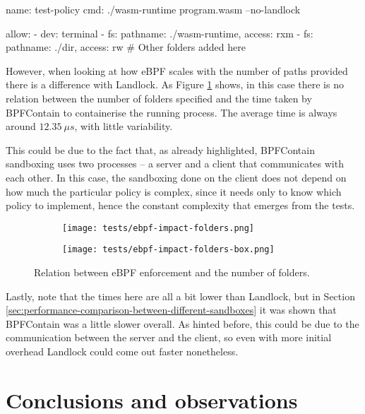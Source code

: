 \vspace*{0.5cm}
\begin{code}[language=yaml, caption=The outline of the policy used for eBPF tests., label=lst:ebpf-impact-policy-outline]
name: test-policy
cmd: ./wasm-runtime program.wasm --no-landlock

allow:
  - dev: terminal
  - fs: {pathname: ./wasm-runtime, access: rxm}
  - fs: {pathname: ./dir, access: rw}
  # Other folders added here
\end{code}

However, when looking at how eBPF scales with the number of paths provided there is a difference
with Landlock. As Figure \ref{fig:perf-test-ebpf-impact-folders} shows, in this case there is no relation between the number
of folders specified and the time taken by BPFContain to containerise the running process.
The average time is always around $12.35\ \mu s$, with little variability.

This could be due to the fact that, as already highlighted, BPFContain sandboxing uses two
processes -- a server and a client that communicates with each other.
In this case, the sandboxing done on the client does not depend on how much
the particular policy is complex, since it needs only to know which policy to implement, hence the constant
complexity that emerges from the tests.

\begin{figure}[hbt!]
  \centering
  \begin{subfigure}[b]{0.49\textwidth}
    \texttt{[image: tests/ebpf-impact-folders.png]}
  \end{subfigure}
  \begin{subfigure}[b]{0.49\textwidth}
    \texttt{[image: tests/ebpf-impact-folders-box.png]}
  \end{subfigure}

  \caption{Relation between eBPF enforcement and the number of folders.}
  \label{fig:perf-test-ebpf-impact-folders}
\end{figure}

Lastly, note that the times here are all a bit lower than Landlock, but in Section \ref{sec:performance-comparison-between-different-sandboxes}
it was shown that BPFContain was a little slower overall. As hinted before, this could be due to the communication
between the server and the client, so even with more initial overhead Landlock could come out
faster nonetheless.

\clearpage
\section{Conclusions and observations}


